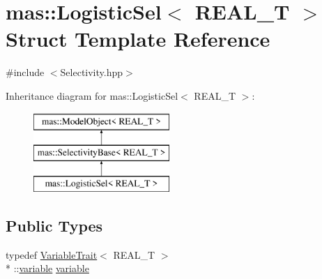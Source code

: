 \hypertarget{structmas_1_1_logistic_sel}{\section{mas\-:\-:Logistic\-Sel$<$ R\-E\-A\-L\-\_\-\-T $>$ Struct Template Reference}
\label{structmas_1_1_logistic_sel}
}


{\ttfamily \#include $<$Selectivity.\-hpp$>$}

Inheritance diagram for mas\-:\-:Logistic\-Sel$<$ R\-E\-A\-L\-\_\-\-T $>$\-:\begin{figure}[H]
\begin{center}
\leavevmode
\includegraphics[height=3.000000cm]{structmas_1_1_logistic_sel}
\end{center}
\end{figure}
\subsection*{Public Types}
\begin{DoxyCompactItemize}
\item 
typedef \hyperlink{structmas_1_1_variable_trait}{Variable\-Trait}$<$ R\-E\-A\-L\-\_\-\-T $>$\\*
\-::\hyperlink{structmas_1_1_logistic_sel_afd5ce39e0aaab3c2bbe4cdab00f0273e}{variable} \hyperlink{structmas_1_1_logistic_sel_afd5ce39e0aaab3c2bbe4cdab00f0273e}{variable}
\end{DoxyCompactItemize}
